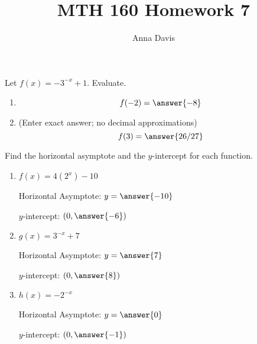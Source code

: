 \documentclass{ximera}
\author{Anna Davis} \title{MTH 160 Homework 7}
\begin{document}
\begin{abstract}

\end{abstract}
\maketitle


 
  \begin{problem}\label{prob:160hom7prob1} 
Let $f(x)=-3^{-x}+1$.  Evaluate.
  \begin{enumerate}
\item
 $$f(-2)=\answer{-8}$$
\item (Enter exact answer; no decimal approximations)
$$f(3)=\answer{26/27}$$
  \end{enumerate}
\end{problem}  
   \begin{problem}\label{prob:160hom7prob2}
 Find the horizontal asymptote and the $y$-intercept for each function.
 \begin{enumerate}
     \item $f(x)=4(2^x)-10$
     
     Horizontal Asymptote: $y=\answer{-10}$
     
     $y$-intercept: $(0, \answer{-6})$
     \item $g(x)=3^{-x}+7$
     
     Horizontal Asymptote: $y=\answer{7}$
     
     $y$-intercept: $(0, \answer{8})$
     \item $h(x)=-2^{-x}$
     
     Horizontal Asymptote: $y=\answer{0}$
     
     $y$-intercept: $(0, \answer{-1})$
 \end{enumerate}
   \end{problem}
\end{document}

